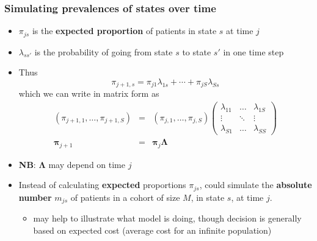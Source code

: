\begin{frame}

\frametitle{Simulating prevalences of states over time}

\begin{itemize}
\item $\pi_{js}$ is the \textbf{expected proportion} of patients in state $s$ at time $j$
\item $\lambda_{ss'}$ is the probability of going from state $s$ to state $s'$ in one time step
\item Thus \myblue 
$$\pi_{j+1,s}=\pi_{j1}\lambda_{1s}+\cdots+\pi_{jS}\lambda_{Ss}$$
\black 
which we can write in matrix form as \myblue
\[
\begin{array}{rcl}
(\pi_{j+1,1},\ldots,\pi_{j+1,S})&=&(\pi_{j,1},\ldots,\pi_{j,S})
\left(
\begin{array}{ccc}
\lambda_{11} & \ldots & \lambda_{1S} \\
\vdots & \ddots & \vdots \\
\lambda_{S1} & \ldots & \lambda_{SS} 
\end{array}
\right) \nonumber \\
\bm{\pi}_{j+1}&=&\bm{\pi}_j \bm\Lambda
\end{array}
\]
\black 
\item \textbf{NB}: $\bm\Lambda$ may depend on time $j$

\pause

\item Instead of calculating \textbf{expected} proportions $\pi_{js}$, could
  simulate the \textbf{absolute number} $m_{js}$ of patients in a
  cohort of size $M$, in state $s$, at time $j$.
  \begin{itemize}
  \item may help to illustrate what model is doing, though decision is generally based on \alert{expected} cost (average cost for an infinite population)
  \end{itemize}
  
\end{itemize}





\end{frame}



